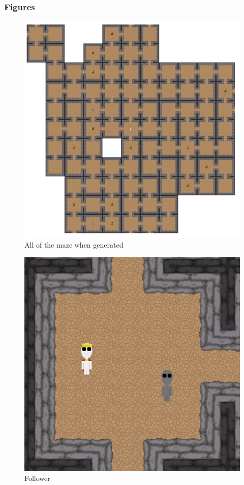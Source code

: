 \documentclass[../Main.tex]{subfiles}
\begin{document}
        \subsubsection{Figures}
            \begin{figure}[hbt!]
                \centerline{\includegraphics[scale=0.4]{img/Testing/Objective/Full Maze.png}}
                \caption{All of the maze when generated}
                \label{fig:FullMaze}
            \end{figure}
            \begin{figure}[hbt!]
                \centerline{\includegraphics[scale=0.4]{img/Testing/Objective/Follower.png}}
                \caption{Follower}
                \label{fig:Follower}
            \end{figure}
\end{document}
